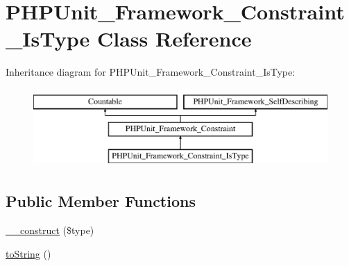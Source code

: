 \hypertarget{class_p_h_p_unit___framework___constraint___is_type}{}\section{P\+H\+P\+Unit\+\_\+\+Framework\+\_\+\+Constraint\+\_\+\+Is\+Type Class Reference}
\label{class_p_h_p_unit___framework___constraint___is_type}
Inheritance diagram for P\+H\+P\+Unit\+\_\+\+Framework\+\_\+\+Constraint\+\_\+\+Is\+Type\+:\begin{figure}[H]
\begin{center}
\leavevmode
\includegraphics[height=3.000000cm]{class_p_h_p_unit___framework___constraint___is_type}
\end{center}
\end{figure}
\subsection*{Public Member Functions}
\begin{DoxyCompactItemize}
\item 
\mbox{\hyperlink{class_p_h_p_unit___framework___constraint___is_type_ac395571e7767c80119b30cf2e5087c59}{\+\_\+\+\_\+construct}} (\$type)
\item 
\mbox{\hyperlink{class_p_h_p_unit___framework___constraint___is_type_a5558c5d549f41597377fa1ea8a1cefa3}{to\+String}} ()
\end{DoxyCompactItemize}
